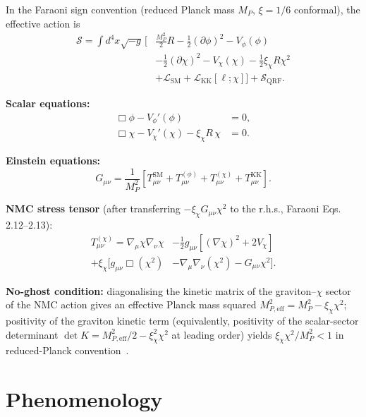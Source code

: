 \documentclass[reprint,amsmath,amssymb,aps,prd,superscriptaddress]{revtex4-2}
\providecommand{\1}{\mathbf{1}}
\begin{document}
In the Faraoni sign convention (reduced Planck mass $M_P$, $\xi = 1/6$ conformal), the effective action is
\begin{align}
\mathcal{S} = \int d^4 x \sqrt{-g}\, \Big[ & \frac{M_P^2}{2} R - \tfrac{1}{2}(\partial \phi)^2 - V_\phi(\phi) \nonumber \\
& - \tfrac{1}{2}(\partial \chi)^2 - V_\chi(\chi) - \tfrac{1}{2}\xi_\chi R \chi^2 \nonumber \\
& + \mathcal{L}_{\mathrm{SM}} + \mathcal{L}_{\mathrm{KK}}[\ell; \chi] \Big] + \mathcal{S}_{\mathrm{QRF}}.
\end{align}

\textbf{Scalar equations:}
\begin{align}
\Box \phi - V_\phi'(\phi) &= 0,\\
\Box \chi - V_\chi'(\chi) - \xi_\chi R\, \chi &= 0.
\end{align}

\textbf{Einstein equations:}
\begin{equation}
G_{\mu\nu} = \frac{1}{M_P^2} \left[ T_{\mu\nu}^{\mathrm{SM}} + T_{\mu\nu}^{(\phi)} + T_{\mu\nu}^{(\chi)} + T_{\mu\nu}^{\mathrm{KK}} \right].
\end{equation}

\textbf{NMC stress tensor} (after transferring $-\xi_\chi G_{\mu\nu} \chi^2$ to the r.h.s., Faraoni Eqs. 2.12--2.13):
\begin{align}
T_{\mu\nu}^{(\chi)} = \nabla_\mu \chi \nabla_\nu \chi & - \tfrac{1}{2} g_{\mu\nu}\left[(\nabla \chi)^2 + 2 V_\chi\right] \nonumber \\
+ \xi_\chi \Big[ g_{\mu\nu} \Box(\chi^2) & - \nabla_\mu \nabla_\nu(\chi^2) - G_{\mu\nu} \chi^2 \Big].
\end{align}

\textbf{No-ghost condition:} diagonalising the kinetic matrix of the graviton--$\chi$ sector of the NMC action gives an effective Planck mass squared $M_{P,\mathrm{eff}}^2 = M_P^2 - \xi_\chi \chi^2$; positivity of the graviton kinetic term (equivalently, positivity of the scalar-sector determinant $\det K = M_{P,\mathrm{eff}}^2/2 - \xi_\chi^2 \chi^2$ at leading order) yields
$\xi_\chi \chi^2 / M_P^2 < 1$ in reduced-Planck convention~\cite{Faraoni2004}. %

\section{Phenomenology}
\end{document}
